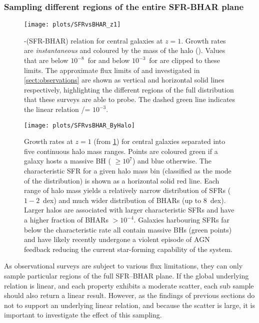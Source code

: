 \subsubsection{Sampling different regions of the entire SFR-BHAR plane}
\label{sect:sfr_vs_bhar_plane}

\begin{figure}
\texttt{[image: plots/SFRvsBHAR\_z1]}

\caption{\SFR-\BHAR (SFR-BHAR) relation for central galaxies at $z=1$. Growth
rates are \textit{instantaneous} and coloured by the mass of the halo
(). Values that are below $10^{-8}$~\Msolyr for \BHAR and below
$10^{-3}$~\Msolyr for \SFR are clipped to these limits. The approximate flux
limits of \citet{Stanley2015} and \citet{Delvecchio2015} investigated in
\cref{sect:observations} are shown as vertical and horizontal solid lines
respectively, highlighting the different regions of the full distribution that
these surveys are able to probe. The dashed green line indicates the linear
relation \BHAR/\SFR = $10^{-3}$.}

\label{fig:sfr_vs_bhar_z1}
\end{figure}

\begin{figure}
\texttt{[image: plots/SFRvsBHAR\_ByHalo]}

\caption{Growth rates at $z=1$ (from \cref{fig:sfr_vs_bhar_z1}) for central
galaxies separated into five continuous halo mass ranges. Points are coloured
green if a galaxy hosts a massive BH ( $\geq 10^{7}$\Msol) and blue
otherwise. The characteristic SFR for a given halo mass bin (classified as the
mode of the distribution) is shown as a horizontal solid red line. Each range
of halo mass yields a relatively narrow distribution of SFRs ($1-2$~dex) and
much wider distribution of BHARs (up to 8~dex).  Larger halos are associated
with larger characteristic SFRs and have a higher fraction of BHARs $>
10^{-4}$\Msolyr. Galaxies harbouring SFRs far below the characteristic rate all
contain massive BHs (green points) and have likely recently undergone a violent
episode of AGN feedback reducing the current star-forming capability of the
system.}

\label{fig:sfr_vs_bhar_byhalo} \end{figure}

As observational surveys are subject to various flux limitations, they can only
sample particular regions of the full SFR--BHAR plane.  If the global
underlying relation is linear, and each property exhibits a moderate scatter,
each sub sample should also return a linear result.  However, as the findings
of previous sections do not to support an underlying linear relation, and
because the scatter is large, it is important to investigate the effect of this
sampling. 

